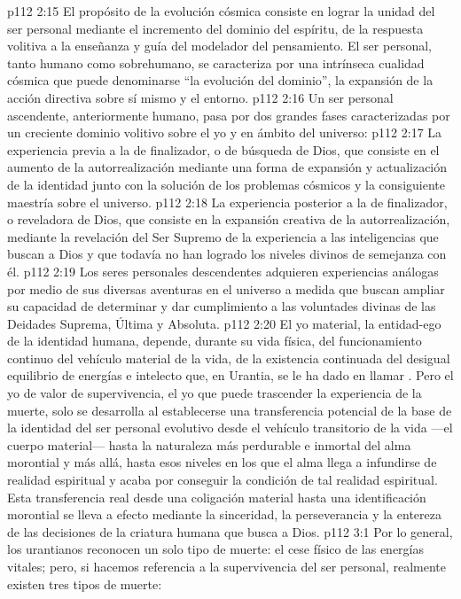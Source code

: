 \vs p112 2:15 El propósito de la evolución cósmica consiste en lograr la unidad del ser personal mediante el incremento del dominio del espíritu, de la respuesta volitiva a la enseñanza y guía del modelador del pensamiento. El ser personal, tanto humano como sobrehumano, se caracteriza por una intrínseca cualidad cósmica que puede denominarse “la evolución del dominio”, la expansión de la acción directiva sobre sí mismo y el entorno.
\vs p112 2:16 \pc Un ser personal ascendente, anteriormente humano, pasa por dos grandes fases caracterizadas por un creciente dominio volitivo sobre el yo y en ámbito del universo:
\vs p112 2:17 La experiencia previa a la de finalizador, o de búsqueda de Dios, que consiste en el aumento de la autorrealización mediante una forma de expansión y actualización de la identidad junto con la solución de los problemas cósmicos y la consiguiente maestría sobre el universo.
\vs p112 2:18 La experiencia posterior a la de finalizador, o reveladora de Dios, que consiste en la expansión creativa de la autorrealización, mediante la revelación del Ser Supremo de la experiencia a las inteligencias que buscan a Dios y que todavía no han logrado los niveles divinos de semejanza con él.
\vs p112 2:19 \pc Los seres personales descendentes adquieren experiencias análogas por medio de sus diversas aventuras en el universo a medida que buscan ampliar su capacidad de determinar y dar cumplimiento a las voluntades divinas de las Deidades Suprema, Última y Absoluta.
\vs p112 2:20 \pc El yo material, la entidad\hyp{}ego de la identidad humana, depende, durante su vida física, del funcionamiento continuo del vehículo material de la vida, de la existencia continuada del desigual equilibrio de energías e intelecto que, en Urantia, se le ha dado en llamar . Pero el yo de valor de supervivencia, el yo que puede trascender la experiencia de la muerte, solo se desarrolla al establecerse una transferencia potencial de la base de la identidad del ser personal evolutivo desde el vehículo transitorio de la vida ---el cuerpo material--- hasta la naturaleza más perdurable e inmortal del alma morontial y más allá, hasta esos niveles en los que el alma llega a infundirse de realidad espiritual y acaba por conseguir la condición de tal realidad espiritual. Esta transferencia real desde una coligación material hasta una identificación morontial se lleva a efecto mediante la sinceridad, la perseverancia y la entereza de las decisiones de la criatura humana que busca a Dios.
\vs p112 3:1 Por lo general, los urantianos reconocen un solo tipo de muerte: el cese físico de las energías vitales; pero, si hacemos referencia a la supervivencia del ser personal, realmente existen tres tipos de muerte:
